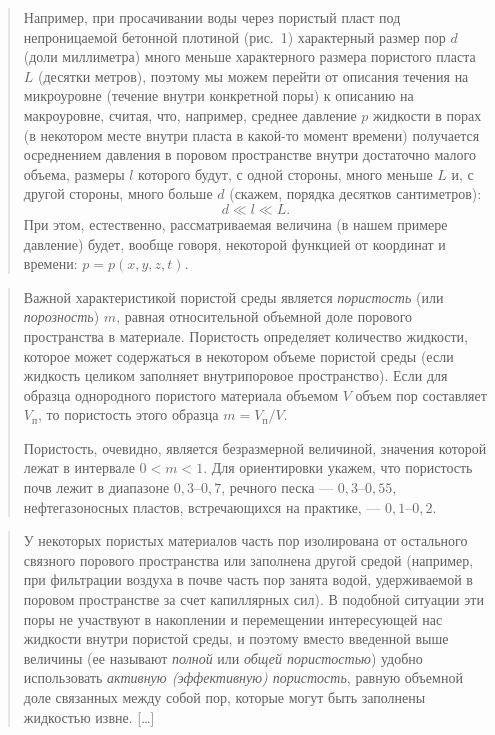 \documentclass[12pt,a4paper]{article}
\newenvironment{textquote}{\begin{quote}\sloppy}{\end{quote}}
\begin{document}
\begin{textquote}
Например, при просачивании воды через пористый пласт под непроницаемой бетонной плотиной (рис.~1) характерный размер пор $d$ (доли миллиметра) много меньше характерного размера пористого пласта $L$ (десятки метров), поэтому мы можем перейти от описания течения на микроуровне (течение внутри конкретной поры) к описанию на макроуровне, считая, что, например, среднее давление $p$ жидкости в порах (в некотором месте внутри пласта в какой-то момент времени) получается осреднением давления в поровом пространстве внутри достаточно малого объема, размеры $l$ которого будут, с одной стороны, много меньше $L$ и, с другой стороны, много больше $d$ (скажем, порядка десятков сантиметров):
\begin{equation}
d\ll l\ll L.
\tag{1.1}\label{q1:eq-1-1}
\end{equation}
При этом, естественно, рассматриваемая величина (в нашем примере давление) будет, вообще говоря, некоторой функцией от
координат и времени: $p=p(x,y,z,t)$.
\end{textquote}

\begin{textquote}
Важной характеристикой пористой среды является \textit{пористость} (или \textit{порозность}) $m$, равная относительной объемной доле порового пространства в материале. Пористость определяет количество жидкости, которое может содержаться в некотором объеме пористой среды (если жидкость целиком заполняет внутрипоровое пространство). Если для образца однородного пористого материала объемом $V$ объем пор составляет $V_{\text{п}}$, то пористость этого образца $m=V_{\text{п}}/V$.

Пористость, очевидно, является безразмерной величиной, значения которой лежат в интервале $0<m<1$. Для ориентировки укажем, что пористость почв лежит в диапазоне $0{,}3$--$0{,}7$, речного песка --- $0{,}3$--$0{,}55$, нефтегазоносных пластов, встречающихся на практике, --- $0{,}1$--$0{,}2$.
\end{textquote}

\begin{textquote}
У некоторых пористых материалов часть пор изолирована от остального связного порового пространства или заполнена другой средой (например, при фильтрации воздуха в почве часть пор занята водой, удерживаемой в поровом пространстве за счет капиллярных сил). В подобной ситуации эти поры не участвуют в накоплении и перемещении интересующей нас жидкости внутри пористой среды, и поэтому вместо введенной выше величины (ее называют \textit{полной} или \textit{общей пористостью}) удобно использовать \textit{активную (эффективную) пористость}, равную объемной доле связанных между собой пор, которые могут быть заполнены жидкостью извне. […]
\end{textquote}
\end{document}
